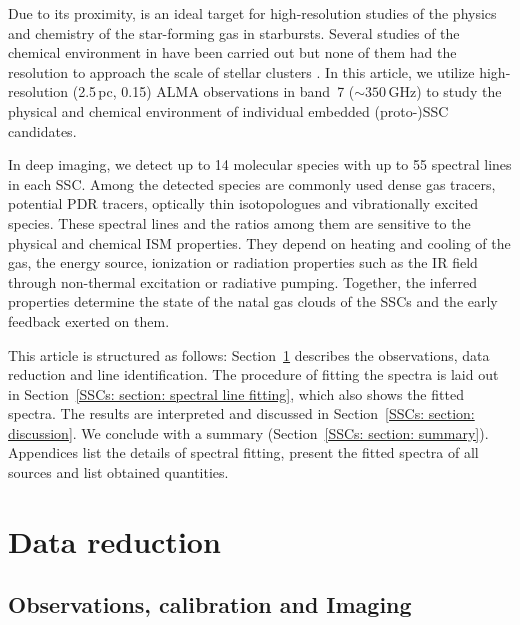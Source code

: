 Due to its proximity,  is an ideal target for high-resolution studies of the physics and chemistry of the star-forming gas in starbursts. Several studies of the chemical environment in  have been carried out but none of them had the resolution to approach the scale of stellar clusters \citep[e.g.][]{2006ApJS..164..450M,2015ApJ...801...63M,2015A&A...579A.101A,2019ApJ...871..170M}. In this article, we utilize high-resolution (2.5\,pc, 0.15\arcsec) ALMA observations in band~7 ($\sim 350$\,GHz) to study the physical and chemical environment of individual embedded (proto-)SSC candidates. 

In deep imaging, we detect up to 14 molecular species with up to 55 spectral lines in each SSC.
Among the detected species are commonly used dense gas tracers, potential PDR tracers, optically thin isotopologues and vibrationally excited species. 
These spectral lines and the ratios among them are sensitive to the physical and chemical ISM properties. They depend on heating and cooling of the gas, the energy source, ionization or radiation properties such as the IR field through non-thermal excitation or radiative pumping. Together, the inferred properties determine the state of the natal gas clouds of the SSCs and the early feedback exerted on them.

This article is structured as follows: Section~\ref{SSCs: section: data} describes the observations, data reduction and line identification. The procedure of fitting the spectra is laid out in Section~\ref{SSCs: section: spectral line fitting}, which also shows the fitted spectra. The results are interpreted and discussed in Section~\ref{SSCs: section: discussion}. We conclude with a summary (Section~\ref{SSCs: section: summary}). Appendices list the details of spectral fitting, present the fitted spectra of all sources and list obtained quantities.



\section{Data reduction}\label{SSCs: section: data}

\subsection{Observations, calibration and Imaging}

